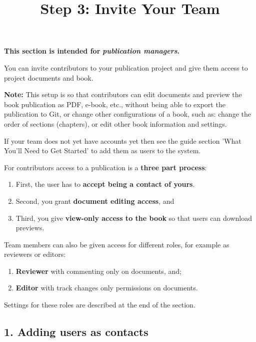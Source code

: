 \documentclass{article}
\begin{document}
\title{Step 3: Invite Your Team}

\maketitle


\textbf{This section is intended for }\emph{\textbf{publication managers}}\textbf{.}


You can invite contributors to your publication project and give them access to project documents and book.


\textbf{Note:} This setup is so that contributors can edit documents and preview the book publication as PDF, e-book, etc., without being able to export the publication to Git, or change other configurations of a book, such as: change the order of sections (chapters), or edit other book information and settings.


If your team does not yet have accounts yet then see the guide section 'What You'll Need to Get Started' to add them as users to the system.


For contributors access to a publication is a \textbf{three part process}:

\begin{enumerate}
\item First, the user has to \textbf{accept being a contact of yours}.


\item Second, you grant \textbf{document editing access}, and 


\item Third, you give \textbf{view-only access to the book} so that users can download previews.  


\end{enumerate}

Team members can also be given access for different roles, for example as reviewers or editors:

\begin{enumerate}
\item \textbf{Reviewer} with commenting only on documents, and; 


\item \textbf{Editor} with track changes only permissions on documents.


\end{enumerate}

Settings for these roles are described at the end of the section.


\subsection{1. Adding users as contacts}\label{H3777938}
\end{document}
